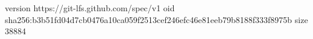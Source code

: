 version https://git-lfs.github.com/spec/v1
oid sha256:b3b51fd04d7cb0476a10ca059f2513cef246efc46e81eeb79b8188f333f8975b
size 38884
